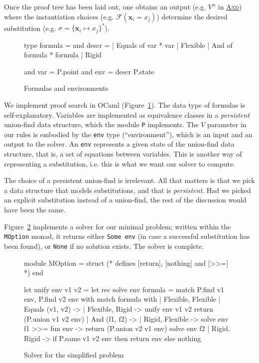 \documentclass{easychair}
\def\li{\lstinline}
\let\TirName\textsc
\renewcommand{\DefTirName}[1]{\hyperlink{#1}{\TirName {#1}}}
\let\Rule\DefTirName
\newcommand{\fref}[1]{Figure~\ref{fig:#1}}
\newcommand{\f}[1]{\ensuremath{\mathbf{#1}}} %
\newcommand{\F}{\ensuremath{\mathcal{F}}} %
\begin{document}
Once the proof tree has been laid out, one obtains an output (e.g. $V''$ in
\Rule{And}) where the instantiation choices (e.g. $\F (\f x_i = x_j)$) determine
the desired substitution (e.g. $\sigma = \{ \f x_i \mapsto x_j \}^*$).

\begin{figure}
  \centering
  \begin{ocaml}
type formula =                and descr =
| Equals of var * var           | Flexible
| And of formula * formula      | Rigid

and var = P.point             and env = descr P.state
  \end{ocaml}
  \caption{Formulas and environments}
  \label{fig:formulas}
\end{figure}

We implement proof search in OCaml (\fref{formulas}). The data type of formulas
is self-explanatory. Variables are implemented as equivalence classes in a
\emph{persistent} union-find data structure, which the module \li+P+ implements.
The $V$ parameter in our rules is embodied by the \li+env+ type
(``environment''), which is an input and an output to the solver. An
\li+env+ represents a given state of the union-find data structure, that is, a
set of equations between variables. This is another way of representing a
substitution, i.e. this is what we want our solver to compute.

The choice of a persistent union-find is irrelevant. All that matters is that we
pick a data structure that models substitutions, and that is \emph{persistent}.
Had we picked an explicit substitution instead of a union-find, the rest of the
discussion would have been the same.

\fref{solver} implements a solver for our minimal problem; written within the
\li+MOption+ monad, it returns either \li+Some env+ (in case a successful
substitution has been found), or \li+None+ if no solution exists. The solver is
complete.

\begin{figure}
  \centering
  \begin{ocaml}
module MOption = struct
  (* defines [return], [nothing] and [>>=] *)
end

let unify env v1 v2 =                         let rec solve env formula =
  match P.find v1 env, P.find v2 env with       match formula with
  | Flexible, Flexible                          | Equals (v1, v2) ->
  | Flexible, Rigid ->                              unify env v1 v2
      return (P.union v1 v2 env)                | And (f1, f2) ->
  | Rigid, Flexible ->                              solve env f1 >>= fun env ->
      return (P.union v2 v1 env)                    solve env f2
  | Rigid, Rigid ->
      if P.same v1 v2 env then
        return env
      else
        nothing
  \end{ocaml}
  \caption{Solver for the simplified problem}
  \label{fig:solver}
\end{figure}
\end{document}
